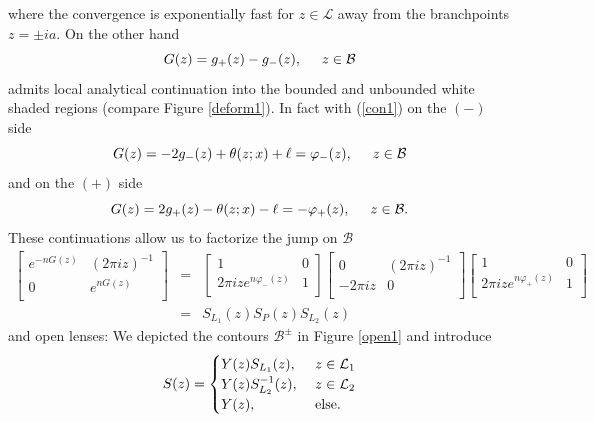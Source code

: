 \documentclass[10pt,oneside,reqno]{amsart}
\numberwithin{equation}{section}
\def\eqref#1{(\ref{#1})}
\begin{document}
where the convergence is exponentially fast for $z\in\mathcal{L}$ away from the branchpoints $z=\pm ia$. On the other hand
\begin{equation}\label{capitalG}
 G(z)=g_+(z)-g_-(z),\hspace{0.5cm}z\in\mathcal{B}
\end{equation}
admits local analytical continuation into the bounded and unbounded white shaded regions (compare Figure \ref{deform1}). In fact with \eqref{con1} on the $(-)$ side
\begin{equation*}
  G(z) = -2g_-(z)+\theta(z;x)+\ell=\varphi_-(z),\hspace{0.5cm}z\in\mathcal{B}
\end{equation*}
and on the $(+)$ side
\begin{equation*}
 G(z) = 2g_+(z)-\theta(z;x)-\ell=-\varphi_+(z),\hspace{0.5cm}z\in\mathcal{B}.
\end{equation*}
These continuations allow us to factorize the jump on $\mathcal{B}$
\begin{eqnarray*}
  \begin{bmatrix}
    e^{-nG(z)} & (2\pi iz)^{-1}\\
  0 & e^{nG(z)}\\
  \end{bmatrix}&=&\begin{bmatrix}
1 & 0\\
2\pi iz e^{n\varphi_-(z)} & 1\\
\end{bmatrix}\begin{bmatrix}
  0 & (2\pi iz)^{-1}\\
-2\pi iz & 0\\
\end{bmatrix}\begin{bmatrix}
1 & 0\\
2\pi iz e^{n\varphi_+(z)}&1\\
\end{bmatrix}\\
&=&S_{L_1}(z)S_P(z)S_{L_2}(z)
\end{eqnarray*}
and open lenses: We depicted the contours $\mathcal{B}^{\pm}$ in Figure \ref{open1} and introduce
\begin{equation}\label{openup}
  S(z) = \begin{cases}
                Y(z) S_{L_1}(z), &\ z\in\mathcal{L}_1\\
		Y(z) S_{L_2}^{-1}(z),&\ z\in\mathcal{L}_2\\
		Y(z),&\ \textnormal{else}.
               \end{cases}
\end{equation}
\end{document}
